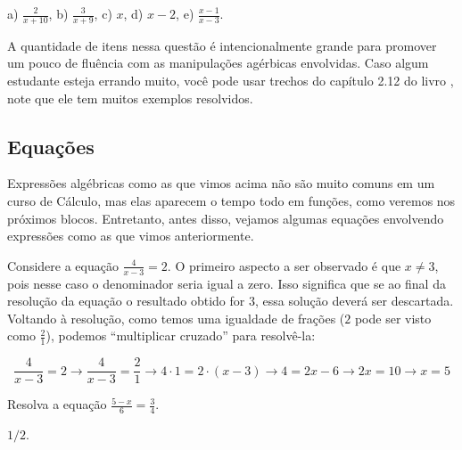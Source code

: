 \documentclass[main.tex]{subfiles}
\begin{document}
\begin{gabarito}
	\begin{gabaritoQuestao}
		a) $\frac{2}{x+10}$, b) $\frac{3}{x+9}$, c) $x$, d) $x-2$, e) $\frac{x-1}{x-3}$.
	\end{gabaritoQuestao}
\end{gabarito}

\paraTutores

A quantidade de itens nessa questão é intencionalmente grande para promover um pouco de fluência com as manipulações agérbicas envolvidas. Caso algum estudante esteja errando muito, você pode usar trechos do capítulo 2.12 do livro , note que ele tem muitos exemplos resolvidos.

\paraAmbos

\subsection*{Equações}

Expressões algébricas como as que vimos acima não são muito comuns em um curso de Cálculo, mas elas aparecem o tempo todo em funções, como veremos nos próximos blocos. Entretanto, antes disso, vejamos algumas equações envolvendo expressões como as que vimos anteriormente.

Considere a equação $\frac{4}{x-3}=2$. O primeiro aspecto a ser observado é que $x\neq3$, pois nesse caso o denominador seria igual a zero. Isso significa que se ao final da resolução da equação o resultado obtido for $3$, essa solução deverá ser descartada. Voltando à resolução, como temos uma igualdade de frações ($2$ pode ser visto como $\frac{2}{1}$), podemos ``multiplicar cruzado'' para resolvê-la:

$$ \frac{4}{x-3}=2 \longrightarrow \frac{4}{x-3}=\frac{2}{1} \longrightarrow 4 \cdot 1 = 2 \cdot (x-3) \longrightarrow 4=2x-6 \longrightarrow 2x=10 \longrightarrow x=5 $$

\begin{questao}
Resolva a equação $\frac{5-x}{6}=\frac{3}{4}$.
\end{questao}

\begin{gabarito}
	\begin{gabaritoQuestao}
		$1/2$.
	\end{gabaritoQuestao}
\end{gabarito}
\end{document}
